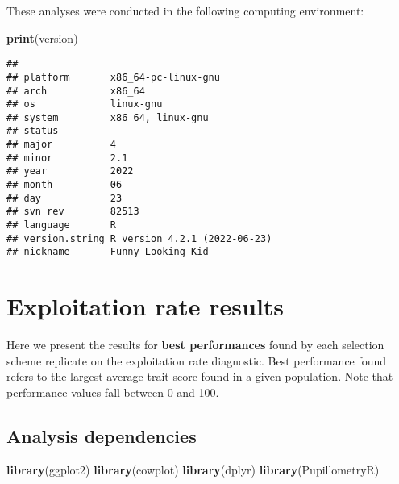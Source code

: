 \documentclass[]{book}
\newenvironment{Shaded}{\begin{snugshade}}{\end{snugshade}}
\newcommand{\KeywordTok}[1]{\textcolor[rgb]{0.13,0.29,0.53}{\textbf{#1}}}
\newcommand{\NormalTok}[1]{#1}
\begin{document}
These analyses were conducted in the following computing environment:

\begin{Shaded}
\begin{Highlighting}[]
\KeywordTok{print}\NormalTok{(version)}
\end{Highlighting}
\end{Shaded}

\begin{verbatim}
##                _                           
## platform       x86_64-pc-linux-gnu         
## arch           x86_64                      
## os             linux-gnu                   
## system         x86_64, linux-gnu           
## status                                     
## major          4                           
## minor          2.1                         
## year           2022                        
## month          06                          
## day            23                          
## svn rev        82513                       
## language       R                           
## version.string R version 4.2.1 (2022-06-23)
## nickname       Funny-Looking Kid
\end{verbatim}

\hypertarget{exploitation-rate-results}{%
\chapter{Exploitation rate results}\label{exploitation-rate-results}}

Here we present the results for \textbf{best performances} found by each selection scheme replicate on the exploitation rate diagnostic.
Best performance found refers to the largest average trait score found in a given population.
Note that performance values fall between 0 and 100.

\hypertarget{analysis-dependencies}{%
\section{Analysis dependencies}\label{analysis-dependencies}}

\begin{Shaded}
\begin{Highlighting}[]
\KeywordTok{library}\NormalTok{(ggplot2)}
\KeywordTok{library}\NormalTok{(cowplot)}
\KeywordTok{library}\NormalTok{(dplyr)}
\KeywordTok{library}\NormalTok{(PupillometryR)}
\end{Highlighting}
\end{Shaded}
\end{document}
